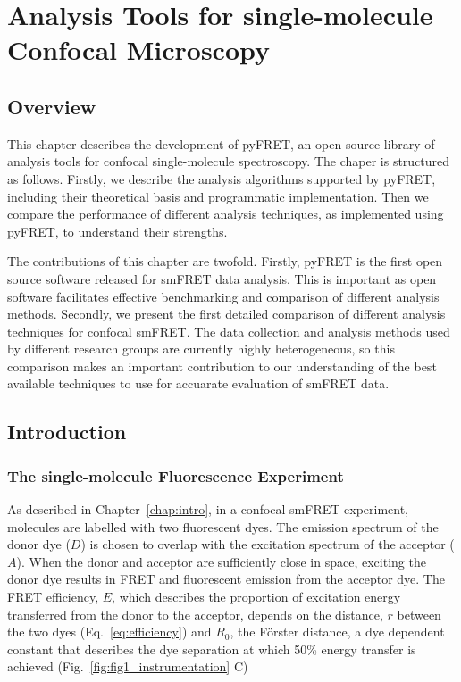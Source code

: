 \chapter{Analysis Tools for single-molecule Confocal Microscopy}
\label{chap:pyfret}
\section{Overview}
This chapter describes the development of pyFRET, an open source library of analysis tools for confocal single-molecule spectroscopy. The chaper is structured as follows. Firstly, we describe the analysis algorithms supported by pyFRET, including their theoretical basis and programmatic implementation. Then we compare the performance of different analysis techniques, as implemented using pyFRET, to understand their strengths. 

The contributions of this chapter are twofold. Firstly, pyFRET is the first open source software released for smFRET data analysis. This is important as open software facilitates effective benchmarking and comparison of different analysis methods. Secondly, we present the first detailed comparison of different analysis techniques for confocal smFRET. The data collection and analysis methods used by different research groups are currently highly heterogeneous, so this comparison makes an important contribution to our understanding of the best available techniques to use for accuarate evaluation of smFRET data.  

\section{Introduction}
\subsection{The single-molecule Fluorescence Experiment}

As described in Chapter~\ref{chap:intro}, in a confocal smFRET experiment, molecules are labelled with two fluorescent dyes. The emission spectrum of the donor dye ($D$) is chosen to overlap with the excitation spectrum of the acceptor ($A$). When the donor and acceptor are sufficiently close in space, exciting the donor dye results in FRET and fluorescent emission from the acceptor dye. The FRET efficiency, $E$, which describes the proportion of excitation energy transferred from the donor to the acceptor, depends on the distance, $r$ between the two dyes (Eq.~\ref{eq:efficiency}) and $R_0$, the F\"{o}rster distance, a dye dependent constant that describes the dye separation at which 50\% energy transfer is achieved (Fig.~\ref{fig:fig1_instrumentation} C)

